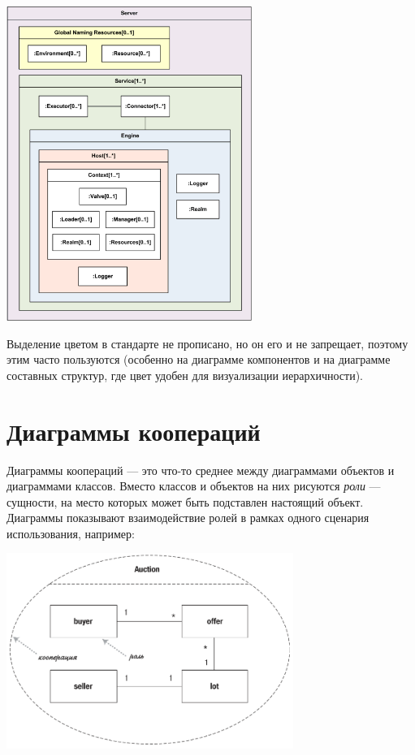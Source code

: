 \documentclass{../mcstext}
\begin{document}
\begin{center}
    \includegraphics[width=0.6\textwidth]{compositeStructureExample.png}
\end{center}

Выделение цветом в стандарте не прописано, но он его и не запрещает, поэтому этим часто пользуются (особенно на диаграмме компонентов и на диаграмме составных структур, где цвет удобен для визуализации иерархичности).

\section{Диаграммы коопераций}

Диаграммы коопераций --- это что-то среднее между диаграммами объектов и диаграммами классов. Вместо классов и объектов на них рисуются \textit{роли} --- сущности, на место которых может быть подставлен настоящий объект. Диаграммы показывают взаимодействие ролей в рамках одного сценария использования, например:

\begin{center}
    \includegraphics[width=0.7\textwidth]{cooperationDiagram.png}
\end{center}
\end{document}
